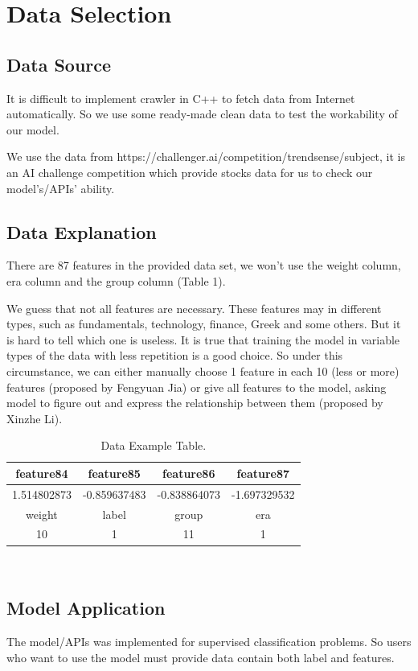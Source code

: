 \documentclass[letterpaper]{article}
\begin{document}
\section{Data Selection}
\label{sec:theory}

\subsection{Data Source}
It is difficult to implement crawler in C++ to fetch data from Internet automatically. So we use some ready-made clean data to test the workability of our model. 


We use the data from https://challenger.ai/competition/trendsense/subject, it is an AI challenge competition which provide stocks data for us to check our model’s/APIs' ability.

\subsection{Data Explanation}

There are 87 features in the provided data set, we won’t use the weight column, era column and the group column (Table 1). 

We guess that not all features are necessary. These features may in different types, such as fundamentals, technology, finance, Greek and some others. But it is hard to tell which one is useless. It is true that training the model in variable types of the data with less repetition is a good choice. So under this circumstance, we can either manually choose 1 feature in each 10 (less or more) features (proposed by Fengyuan Jia) or give all features to the model, asking model to figure out and express the relationship between them (proposed by Xinzhe Li).    
\begin{table}[H]
\centering
\begin{tabular}{|c|c|c|c|}
 \hline
feature84& feature85& feature86& feature87 \\
 \hline
1.514802873 & -0.859637483 & -0.838864073 &-1.697329532  \\
 \hline
weight& label& group& era\\
  \hline
10 & 1&11&1\\
\hline
\end{tabular}\\
\caption{\label{tab:widgets}Data Example Table.}
\end{table}

\subsection{Model Application}
The model/APIs was implemented for supervised classification problems. So users who want to use the model must provide data contain both label and features. 
\end{document}
